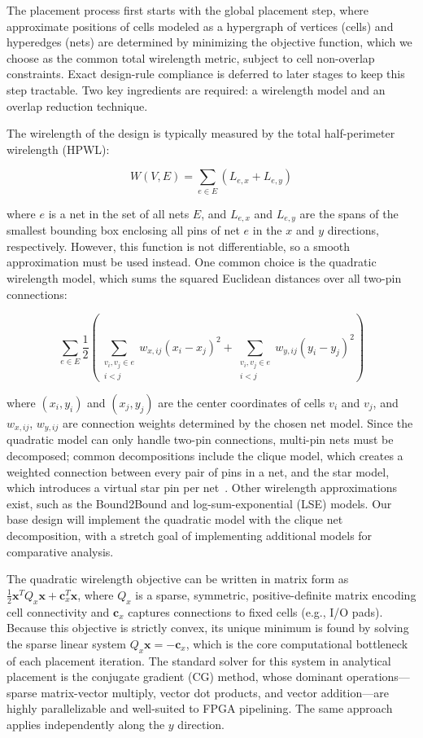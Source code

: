 \documentclass[conference]{IEEEtran}
\begin{document}
The placement process first starts with the global placement step, where approximate positions of cells modeled as a hypergraph of vertices (cells) and hyperedges (nets) are determined by minimizing the objective function, which we choose as the common total wirelength metric, subject to cell non-overlap constraints. Exact design-rule compliance is deferred to later stages to keep this step tractable. Two key ingredients are required: a wirelength model and an overlap reduction technique.

The wirelength of the design is typically measured by the total half-perimeter wirelength (HPWL):

\[
W(V,E) = \sum_{e \in E} \left( L_{e,x} + L_{e,y} \right)
\]

where $e$ is a net in the set of all nets $E$, and $L_{e,x}$ and $L_{e,y}$ are the spans of the smallest bounding box enclosing all pins of net $e$ in the $x$ and $y$ directions, respectively. However, this function is not differentiable, so a smooth approximation must be used instead. One common choice is the quadratic wirelength model, which sums the squared Euclidean distances over all two-pin connections:

\[
\sum_{e \in E} \frac{1}{2}
\left(
\sum_{\substack{v_i, v_j \in e \\ i < j}} w_{x,ij} (x_i - x_j)^2
+
\sum_{\substack{v_i, v_j \in e \\ i < j}} w_{y,ij} (y_i - y_j)^2
\right)
\]

where $(x_i, y_i)$ and $(x_j, y_j)$ are the center coordinates of cells $v_i$ and $v_j$, and $w_{x,ij}$, $w_{y,ij}$ are connection weights determined by the chosen net model. Since the quadratic model can only handle two-pin connections, multi-pin nets must be decomposed; common decompositions include the clique model, which creates a weighted connection between every pair of pins in a net, and the star model, which introduces a virtual star pin per net~\cite{chang2007analytical}. Other wirelength approximations exist, such as the Bound2Bound and log-sum-exponential (LSE) models. Our base design will implement the quadratic model with the clique net decomposition, with a stretch goal of implementing additional models for comparative analysis.

The quadratic wirelength objective can be written in matrix form as $\frac{1}{2}\mathbf{x}^T Q_x \mathbf{x} + \mathbf{c}_x^T \mathbf{x}$, where $Q_x$ is a sparse, symmetric, positive-definite matrix encoding cell connectivity and $\mathbf{c}_x$ captures connections to fixed cells (e.g., I/O pads). Because this objective is strictly convex, its unique minimum is found by solving the sparse linear system $Q_x \mathbf{x} = -\mathbf{c}_x$, which is the core computational bottleneck of each placement iteration. The standard solver for this system in analytical placement is the conjugate gradient (CG) method, whose dominant operations---sparse matrix-vector multiply, vector dot products, and vector addition---are highly parallelizable and well-suited to FPGA pipelining. The same approach applies independently along the $y$ direction.
\end{document}
